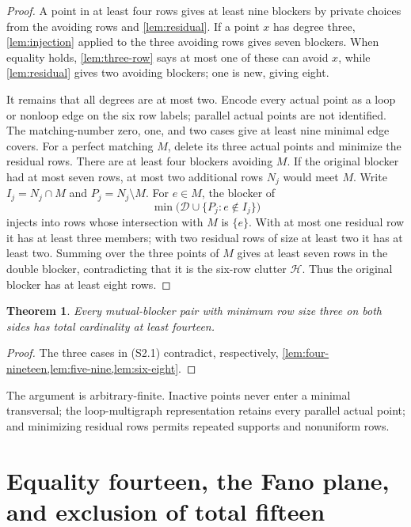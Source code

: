 \documentclass[11pt,a4paper]{article}
\newtheorem{theorem}{Theorem}[section]
\theoremstyle{definition}
\newcommand{\minrows}{\operatorname{min}}
\begin{document}
\begin{proof}
A point in at least four rows gives at least nine blockers by private choices
from the avoiding rows and \cref{lem:residual}.  If a point $x$ has degree
three, \cref{lem:injection} applied to the three avoiding rows gives seven
blockers.  When equality holds, \cref{lem:three-row} says at most one of
these can avoid $x$, while \cref{lem:residual} gives two avoiding blockers;
one is new, giving eight.

It remains that all degrees are at most two.  Encode every actual point as a
loop or nonloop edge on the six row labels; parallel actual points are not
identified.  The matching-number zero, one, and two cases give at least nine
minimal edge covers.  For a perfect matching $M$, delete its three actual
points and minimize the residual rows.  There are at least four blockers
avoiding $M$.  If the original blocker had at most seven rows, at most two
additional rows $N_j$ would meet $M$.  Write
$I_j=N_j\cap M$ and $P_j=N_j\setminus M$.  For $e\in M$, the blocker of
\[
 \minrows\bigl(\mathcal D\cup\{P_j:e\notin I_j\}\bigr)
\]
injects into rows whose intersection with $M$ is $\{e\}$.  With at most one
residual row it has at least three members; with two residual rows of size at
least two it has at least two.  Summing over the three points of $M$ gives at
least seven rows in the double blocker, contradicting that it is the
six-row clutter $\mathcal H$.  Thus the original blocker has at least eight
rows.
\end{proof}

\begin{theorem}
\label{thm:m33-lower}
Every mutual-blocker pair with minimum row size three on both sides has total
cardinality at least fourteen.
\end{theorem}

\begin{proof}
The three cases in (S2.1) contradict, respectively,
\cref{lem:four-nineteen,lem:five-nine,lem:six-eight}.
\end{proof}

The argument is arbitrary-finite.  Inactive points never enter a minimal
transversal; the loop-multigraph representation retains every parallel
actual point; and minimizing residual rows permits repeated supports and
nonuniform rows.

\section{Equality fourteen, the Fano plane, and exclusion of total fifteen}
\label{sec:m33-classification}
\end{document}
